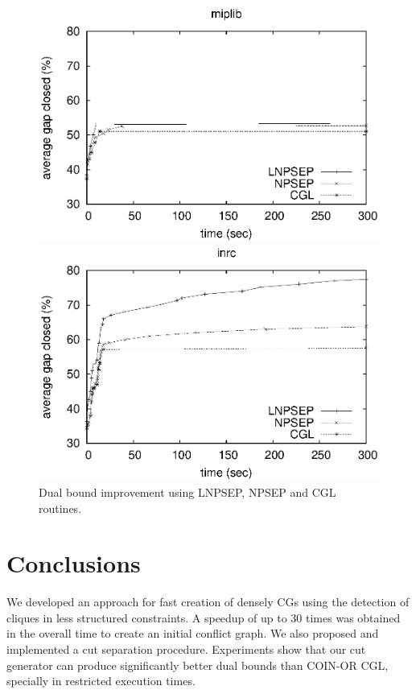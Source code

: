 \documentclass{endm}
\begin{document}
\begin{figure}	
	\begin{minipage}[h]{.5\textwidth}
		\begin{center}
			\includegraphics[width=1\textwidth]{miplib.eps}
		\end{center}
	\end{minipage}
	\begin{minipage}[h]{.5\textwidth}
		\begin{center}
			\includegraphics[width=1\textwidth]{nurse.eps}
		\end{center}
	\end{minipage}
	\caption{Dual bound improvement using LNPSEP, NPSEP and CGL routines.}
	\label{figExperiments}
\end{figure}

\section{Conclusions}\label{conclusions}

We developed an approach for fast creation of densely CGs using the detection of cliques in less structured constraints. A speedup of up to 30 times was obtained in the overall time to create an initial conflict graph. We also proposed and implemented a cut separation procedure. Experiments show that our cut generator can produce significantly better dual bounds than COIN-OR CGL, specially in restricted execution times.



\end{document}
